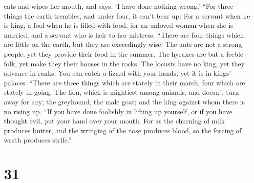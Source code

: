eats and wipes her mouth, and says, `I have done nothing wrong.'
 ``For three things the earth trembles, and under four, it
can't bear up:  For a servant when he is king, a fool when
he is filled with food,  for an unloved woman when she is
married, and a servant who is heir to her mistress. 
``There are four things which are little on the earth, but they are
exceedingly wise:  The ants are not a strong people, yet
they provide their food in the summer.  The hyraxes are but
a feeble folk, yet make they their houses in the rocks. 
The locusts have no king, yet they advance in ranks.  You
can catch a lizard with your hands, yet it is in kings' palaces.
 ``There are three things which are stately in their march,
four which are stately in going:  The lion, which is
mightiest among animals, and doesn't turn away for any; 
the greyhound; the male goat; and the king against whom there is no
rising up.  ``If you have done foolishly in lifting up
yourself, or if you have thought evil, put your hand over your mouth.
 For as the churning of milk produces butter, and the
wringing of the nose produces blood, so the forcing of wrath produces
strife.''

\hypertarget{section-25}{%
\section{31}\label{section-25}}

